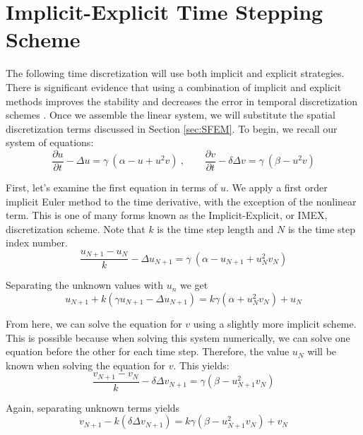 \documentclass[12pt]{article}
\begin{document}
\section{Implicit-Explicit Time Stepping Scheme}\label{sec:imex}

The following time discretization will use both implicit and explicit strategies. There is significant evidence that using a combination of implicit and explicit methods improves the stability and decreases the error in temporal discretization schemes \cite{Madzvamuse2006}. Once we assemble the  linear system, we will substitute the spatial discretization terms discussed in Section \ref{sec:SFEM}. To begin, we recall our system of equations:
\begin{equation}
\frac{\partial u}{\partial t} - \Delta u = \gamma~(\alpha - u + u^2v) ~,~~~~~~~~~
\frac{\partial v}{\partial t} - \delta\Delta v = \gamma~(\beta - u^2v)
\end{equation}

\noindent First, let's examine the first equation in terms of $u$. We apply a first order implicit Euler method to the time derivative, with the exception of the nonlinear term. This is one of many forms known as the Implicit-Explicit, or IMEX, discretization scheme. Note that $k$ is the time step length and $N$ is the time step index number.
\begin{equation}
\frac{u_{N+1} - u_{N}}{k} - \Delta u_{N+1} = \gamma~(\alpha - u_{N+1} + u_{N}^2v_{N}) 
\end{equation}

\noindent Separating the unknown values with $u_n$ we get
\begin{equation}
u_{N+1}+k\left(\gamma u_{N+1} - \Delta u_{N+1}\right) = k\gamma\left(\alpha + u_{N}^2v_{N} \right) + u_{N}
\end{equation}


From here, we can solve the equation for $v$ using a slightly more implicit scheme. This is possible because when solving this system numerically, we can solve one equation before the other for each time step. Therefore, the value $u_N$ will be known when solving the equation for $v$. This yields:
\begin{equation}
\frac{v_{N+1} - v_{N}}{k} - \delta\Delta v_{N+1} = \gamma(\beta - u_{N+1}^2v_{N})
\end{equation}

\noindent Again, separating unknown terms yields
\begin{equation}
v_{N+1}-k\left(\delta\Delta v_{N+1}\right) = k\gamma\left(\beta - u_{N+1}^2v_{N} \right) + v_{N}
\end{equation}
\end{document}
